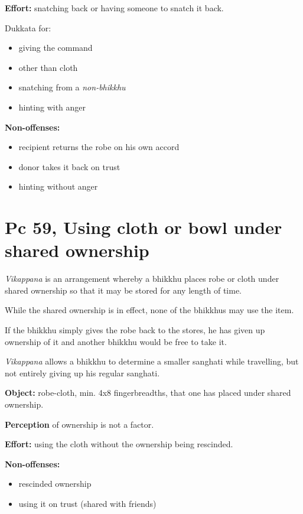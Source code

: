 \textbf{Effort:} snatching back or having someone to snatch it back.

Dukkata for:

\begin{itemize}
\tightlist
\item
  giving the command
\item
  other than cloth
\item
  snatching from a \emph{non-bhikkhu}
\item
  hinting with anger
\end{itemize}

\textbf{Non-offenses:}

\begin{itemize}
\tightlist
\item
  recipient returns the robe on his own accord
\item
  donor takes it back on trust
\item
  hinting without anger
\end{itemize}

\section{Pc 59, Using cloth or bowl under shared ownership}

\emph{Vikappana} is an arrangement whereby a bhikkhu places robe or
cloth under shared ownership so that it may be stored for any length of
time.

While the shared ownership is in effect, none of the bhikkhus may use
the item.

If the bhikkhu simply gives the robe back to the stores, he has given up
ownership of it and another bhikkhu would be free to take it.

\emph{Vikappana} allows a bhikkhu to determine a smaller sanghati while
travelling, but not entirely giving up his regular sanghati.

\textbf{Object:} robe-cloth, min. 4x8 fingerbreadths, that one has
placed under shared ownership.

\textbf{Perception} of ownership is not a factor.

\textbf{Effort:} using the cloth without the ownership being rescinded.

\textbf{Non-offenses:}

\begin{itemize}
\tightlist
\item
  rescinded ownership
\item
  using it on trust (shared with friends)
\end{itemize}

